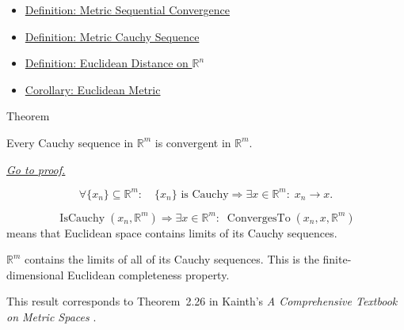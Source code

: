 \begin{dependencies}
\begin{itemize}
  \item \hyperref[def:metric-sequential-convergence]{Definition: Metric Sequential Convergence}
  \item \hyperref[def:metric-cauchy-sequence]{Definition: Metric Cauchy Sequence}
  \item \hyperref[def:euclidean-distance-rn]{Definition: Euclidean Distance on \(\mathbb{R}^n\)}
  \item \hyperref[cor:euclidean-metric]{Corollary: Euclidean Metric}
\end{itemize}
\end{dependencies}

\begin{theorembox}{Theorem}
\begin{theorem}
\label{thm:metric-euclidean-cauchy-sequences-converge}
Every Cauchy sequence in \(\mathbb{R}^m\) is convergent in \(\mathbb{R}^m\).

\smallskip
\noindent
\hyperref[prf:metric-euclidean-cauchy-sequences-converge]{\textit{Go to proof.}}
\end{theorem}
\end{theorembox}

\begin{remark*}
\[
\forall \{x_n\}\subseteq\mathbb{R}^m{:}\quad
\{x_n\}\text{ is Cauchy}
\Longrightarrow
\exists x\in\mathbb{R}^m{:}\; x_n\to x.
\]
\end{remark*}

\begin{remark*}
\[
\operatorname{IsCauchy}(x_n,\mathbb{R}^m)
\Longrightarrow
\exists x\in\mathbb{R}^m{:}\;
\operatorname{ConvergesTo}(x_n,x,\mathbb{R}^m)
\]
means that Euclidean space contains limits of its Cauchy sequences.
\end{remark*}

\begin{remark*}[Interpretation]
\(\mathbb{R}^m\) contains the limits of all of its Cauchy sequences.  This is
the finite-dimensional Euclidean completeness property.
\end{remark*}

\begin{remark*}
This result corresponds to Theorem~2.26 in Kainth's
\emph{A Comprehensive Textbook on Metric Spaces}
\cite{KainthComprehensiveMetricSpaces2023}.
\end{remark*}

